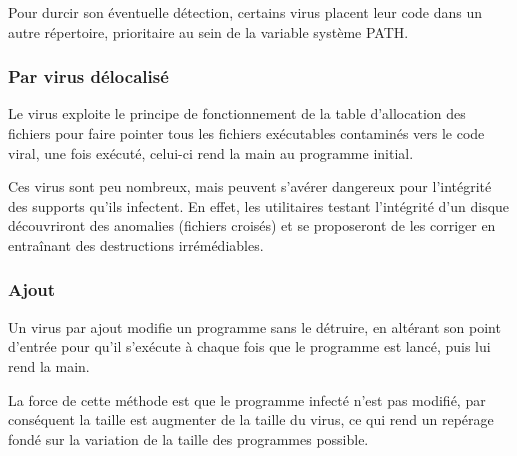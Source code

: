         Pour durcir son éventuelle détection, certains virus placent leur code dans un autre répertoire, 
        prioritaire au sein de la variable système PATH.

        \subsubsection{Par virus délocalisé}
        Le virus exploite le principe de fonctionnement de la table d'allocation des fichiers pour faire pointer 
        tous les fichiers exécutables contaminés vers le code viral, une fois exécuté, celui-ci rend 
        la main au programme initial.

        Ces virus sont peu nombreux, mais peuvent s’avérer dangereux pour l’intégrité des supports qu’ils infectent. 
        En effet, les utilitaires testant l’intégrité d’un disque découvriront des anomalies (fichiers croisés) 
        et se proposeront de les corriger en entraînant des destructions irrémédiables.

        \subsubsection{Ajout}
        Un virus par ajout modifie un programme sans le détruire, en altérant son point d’entrée pour 
        qu’il s'exécute à chaque fois que le programme est lancé, puis lui rend la main.

        La force de cette méthode est que le programme infecté n’est pas modifié, par conséquent la taille 
        est augmenter de la taille du virus, ce qui rend un repérage fondé sur la variation de 
        la taille des programmes possible.

